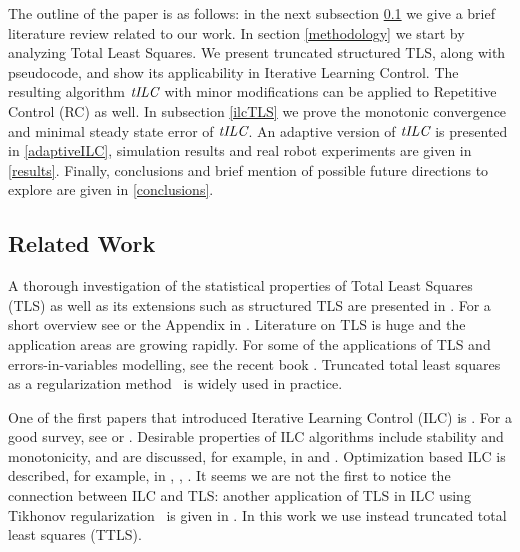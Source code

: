 \documentclass[10pt,a4paper]{article}
\theoremstyle{plain}
\theoremstyle{definition}
\newcommand{\alg}{\emph{tILC}}
\begin{document}
The outline of the paper is as follows: in the next subsection \ref{relatedWork} we give a brief literature review related to our work. In section \ref{methodology} we start by analyzing Total Least Squares. We present truncated structured TLS, along with pseudocode, and show its applicability in Iterative Learning Control. The resulting algorithm $\alg$ with minor modifications can be applied to Repetitive Control (RC) as well. In subsection \ref{ilcTLS} we prove the monotonic convergence and minimal steady state error of $\alg$. An adaptive version of $\alg$ is presented in \ref{adaptiveILC}, simulation results and real robot experiments are given in \ref{results}. Finally, conclusions and brief mention of possible future directions to explore are given in \ref{conclusions}.

\subsection{Related Work}\label{relatedWork}

A thorough investigation of the statistical properties of Total Least Squares (TLS) as well as its extensions such as structured TLS are presented in \cite{VanHuffel91}. For a short overview see \cite{Golub80} or the Appendix in \cite{Golub96}. Literature on TLS is huge and the application areas are growing rapidly. For some of the applications of TLS and errors-in-variables modelling, see the recent book \cite{VanHuffel13}. Truncated total least squares as a regularization method~\cite{Fierro97} is widely used in practice. %

One of the first papers that introduced Iterative Learning Control (ILC) is \cite{Arimoto84}. For a good survey, see \cite{Bristow06} or \cite{Moore07}. Desirable properties of ILC algorithms include stability and monotonicity, and are discussed, for example, in \cite{Norrloef02} and \cite{Bristow06}. Optimization based ILC is described, for example, in \cite{Amann95}, \cite{Bristow06}, \cite{Moore07}. It seems we are not the first to notice the connection between ILC and TLS: another application of TLS in ILC using Tikhonov regularization~\cite{Golub99} is given in \cite{ZhangBo14}. In this work we use instead truncated total least squares (TTLS).

\end{document}
